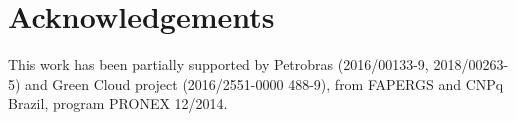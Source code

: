 \documentclass[AMA,final,STIX1COL]{WileyNJD-v2}
\begin{document}


\section*{Acknowledgements}

This work has been partially supported by Petrobras (2016/00133-9, 2018/00263-5) and Green Cloud project (2016/2551-0000 488-9), from FAPERGS and CNPq Brazil, program PRONEX 12/2014.


\end{document}
